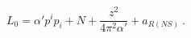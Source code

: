 \begin{equation}
  L_0 = \alpha' p^i p_i + N + \frac{z^2}{4\pi^2\alpha'} + a_{R(NS)}\ .
\end{equation}

